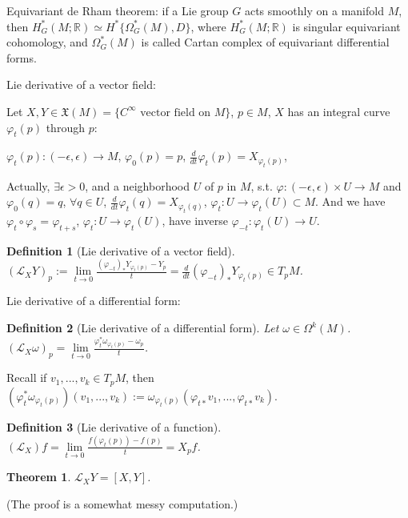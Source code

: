 \documentclass{article}
\theoremstyle{mystyle}
\newtheorem*{definition}{Definition}%
\newtheorem*{theorem*}{Theorem}
\theoremstyle{remark}
\numberwithin{equation}{section}
\begin{document}
Equivariant de Rham theorem: if a Lie group $G$ acts smoothly on a manifold $M$, then $H^*_G(M;\mathbb{R}) \simeq H^*\{\Omega^*_G(M),D\}$, where $H^*_G(M;\mathbb{R})$ is singular equivariant cohomology, and $\Omega^*_G(M)$ is called Cartan complex of equivariant differential forms.

Lie derivative of a vector field:

Let $X,Y\in \mathfrak{X}(M) = \{C^\infty \text{ vector field on }M\}$, $p\in M$, $X$ has an integral curve $\varphi_t(p)$ through $p$:

$\varphi_t(p)\colon (-\epsilon,\epsilon)\rightarrow M$, $\varphi_0(p) = p$, $\frac{d}{dt}\varphi_t(p) = X_{\varphi_t(p)}$, 

Actually, $\exists \epsilon>0$, and a neighborhood $U$ of $p$ in $M$, s.t. $\varphi\colon (-\epsilon,\epsilon)\times U \rightarrow M$ and $\varphi_0(q) = q$, $\forall q\in U$, $\frac{d}{dt}\varphi_t(q) = X_{\varphi_t(q)}$, $\varphi_t\colon U\rightarrow \varphi_t(U)\subset M$. And we have $\varphi_t\circ \varphi_s = \varphi_{t+s}$, $\varphi_t \colon U\rightarrow \varphi_t(U)$, have inverse $\varphi_{-t}\colon \varphi_t(U)\rightarrow U$. 

\begin{definition}[Lie derivative of a vector field]
$\left(\mathcal{L}_XY\right)_p:= \lim\limits_{t\rightarrow 0}
\frac{(\varphi_{-t})_*Y_{\varphi_t(p)}-Y_p}{t} = \frac{d}{dt}(\varphi_{-t})_*Y_{\varphi_t(p)} \in T_pM$.
\end{definition}

Lie derivative of a differential form:



\begin{definition}[Lie derivative of a differential form]
Let $\omega \in \Omega^k(M)$. $\left(\mathcal{L}_X\omega\right)_p = \lim\limits_{t\rightarrow 0} \frac{\varphi_t^*\omega_{\varphi_t(p)} - \omega_p}{t}$.
\end{definition}

Recall if $v_1,...,v_k \in T_pM$, then
$\left(\varphi^*_t\omega_{\varphi_t(p)}\right)
(v_1,...,v_k)
:=
\omega_{\varphi_t(p)}\left(\varphi_{t*}v_1,...,\varphi_{t*}v_k\right)$.



\begin{definition}[Lie derivative of a function]
$\left(\mathcal{L}_X\right)f = \lim\limits_{t\rightarrow 0} \frac{f(\varphi_t(p))-f(p)}{t} = X_p f$.
\end{definition}

\begin{theorem*} $\mathcal{L}_XY = [X,Y]$.
\end{theorem*} 
(The proof is a somewhat messy computation.)
\end{document}
